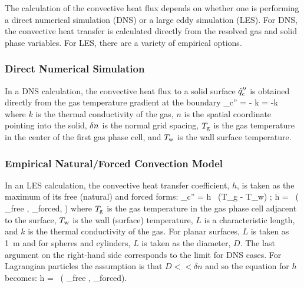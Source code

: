 The calculation of the convective heat flux depends on whether one is performing a direct numerical simulation (DNS) or a large eddy simulation (LES). For DNS, the convective heat transfer is calculated directly from the resolved gas and solid phase variables. For LES, there are a variety of empirical options.

\subsubsection{Direct Numerical Simulation}

In a DNS calculation, the convective heat flux to a solid surface $\dot{q}''_{\rm c}$ is obtained directly from the gas temperature gradient at the boundary
\be
   \dq_{\rm c}'' = - k \;  = -k 
\ee
where $k$ is the thermal conductivity of the gas, $n$ is the spatial coordinate pointing into the solid, $\delta n$ is the normal grid spacing, $T_{\rm g}$ is the gas temperature in the center of the first gas phase cell, and $T_{\rm w}$ is the wall surface temperature.

\subsubsection{Empirical Natural/Forced Convection Model}

In an LES calculation, the convective heat transfer coefficient, $h$, is taken as the maximum of its free (natural) and forced forms:
\be \dq_{\rm c}'' = h \, (T_{\rm g} - T_{\rm w}) \quad ; \quad  h =  \, \max \left( \NU_{\rm free} , \NU_{\rm forced},  \right)   \label{q_con}
\ee
where $T_{\rm g}$ is the gas temperature in the gas phase cell adjacent to the surface, $T_{\rm w}$ is the wall (surface) temperature, $L$ is a characteristic length, and $k$ is the thermal conductivity of the gas. For planar surfaces, $L$ is taken as 1~m and for spheres and cylinders, $L$ is taken as the diameter, $D$. The last argument on the right-hand side corresponds to the limit for DNS cases. For Lagrangian particles the assumption is that $D<<\delta n$ and so the equation for $h$ becomes:
\be h =  \, \max \left( \NU_{\rm free} , \NU_{\rm forced}\right).
\ee

